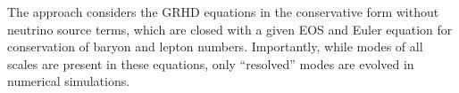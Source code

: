 %
The approach considers the \ac{GRHD} equations in the conservative form 
without neutrino source terms, 
%
which are closed with a given \ac{EOS} and Euler equation for conservation of 
baryon and lepton numbers.
%
Importantly, while modes of all scales are present in these equations, 
only ``resolved'' modes are evolved in numerical simulations. 


